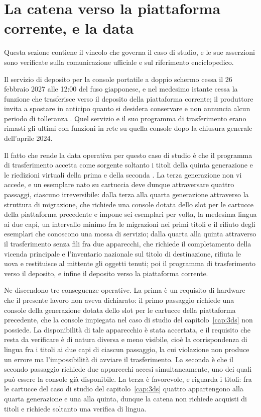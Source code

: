 \section{La catena verso la piattaforma corrente, e la data}

Questa sezione contiene il vincolo che governa il caso di studio, e le sue asserzioni sono verificate sulla comunicazione ufficiale e sul riferimento enciclopedico.

Il servizio di deposito per la console portatile a doppio schermo cessa il 26 febbraio 2027 alle 12:00 del fuso giapponese, e nel medesimo istante cessa la funzione che trasferisce verso il deposito della piattaforma corrente; il produttore invita a spostare in anticipo quanto si desidera conservare e non annuncia alcun periodo di tolleranza \cite{bank-fine-servizio}. Quel servizio e il suo programma di trasferimento erano rimasti gli ultimi con funzioni in rete su quella console dopo la chiusura generale dell'aprile 2024.

Il fatto che rende la data operativa per questo caso di studio è che il programma di trasferimento accetta come sorgente soltanto i titoli della quinta generazione e le riedizioni virtuali della prima e della seconda \cite{bulbapedia-trasferimenti}. La terza generazione non vi accede, e un esemplare nato su cartuccia deve dunque attraversare quattro passaggi, ciascuno irreversibile: dalla terza alla quarta generazione attraverso la struttura di migrazione, che richiede una console dotata dello slot per le cartucce della piattaforma precedente e impone sei esemplari per volta, la medesima lingua ai due capi, un intervallo minimo fra le migrazioni nei primi titoli e il rifiuto degli esemplari che conoscono una mossa di servizio; dalla quarta alla quinta attraverso il trasferimento senza fili fra due apparecchi, che richiede il completamento della vicenda principale e l'inventario nazionale sul titolo di destinazione, rifiuta le uova e restituisce al mittente gli oggetti tenuti; poi il programma di trasferimento verso il deposito, e infine il deposito verso la piattaforma corrente.

Ne discendono tre conseguenze operative. La prima è un requisito di hardware che il presente lavoro non aveva dichiarato: il primo passaggio richiede una console della generazione dotata dello slot per le cartucce della piattaforma precedente, che la console impiegata nel caso di studio del capitolo~\ref{cap:3ds} non possiede. La disponibilità di tale apparecchio è stata accertata, e il requisito che resta da verificare è di natura diversa e meno visibile, cioè la corrispondenza di lingua fra i titoli ai due capi di ciascun passaggio, la cui violazione non produce un errore ma l'impossibilità di avviare il trasferimento. La seconda è che il secondo passaggio richiede due apparecchi accesi simultaneamente, uno dei quali può essere la console già disponibile. La terza è favorevole, e riguarda i titoli: fra le cartucce del caso di studio del capitolo~\ref{cap:3ds} quattro appartengono alla quarta generazione e una alla quinta, dunque la catena non richiede acquisti di titoli e richiede soltanto una verifica di lingua.

